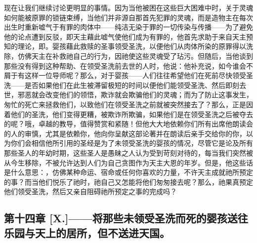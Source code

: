 现在让我们继续讨论更明显的事情。因为当他被困在这些巨大困难中时，关于灵魂如何能被原罪的锁链束缚，当他们并非源自那首先犯罪的灵魂，而是造物主在每次出生时重新嘘气于有罪的肉体中——纯洁无染于罪的一切传染与传播——为了避免他的论点遭到反驳，即天主藉此嘘气使他们成为有罪的，他首先求助于来自天主预知的理论，即。婴孩藉此救赎的圣事领受圣洗，以便他们从肉体所染的原罪得以洗除，仿佛天主在补救祂自己的行为，因祂使这些灵魂受了玷污。但随后，当他谈到那些没有得到这种帮助、在领受圣洗前去世的人时，他说：他补充说，如今谁会不屑于有这样一位导师呢？那么，对于婴孩——人们往往希望他们在死前尽快领受圣洗——是否如果他们在此生被滞留极短的时间以便他们能领受圣洗、然后即刻去世，邪恶就会改变他们的领悟，欺诈就会欺骗他们的灵魂；而为了防止这事发生，匆忙的死亡来拯救他们，以致他们在领受圣洗之前就被突然接去了？那么，正是因着他们的圣洗，他们变得更糟，被欺诈所欺骗，如果他们是在领受圣洗之后被夺去的呢？哦，卓越的教导，值得赞赏和紧随！但他大大地依赖你们所有出席他朗读会的人的审慎，尤其是依赖你，他向你呈献这部论著并在朗读后亲手交给你的你，以为你们会相信他所引用的圣经是为了未领受圣洗的婴孩的情况，尽管它是论及所有那些圣人的年幼时期，这些圣人是愚昧之人认为受到苛刻对待的，每当我们突然被从今生移除，不被允许达到人们为自己贪图作为天主大恩的年岁。但是，他这些话是什么意思：，仿佛某种命运、宿命或任何你喜欢的力量，不许天主成就祂所预定的事？而当他们悦乐了祂时，祂自己又怎能将他们匆匆接去呢？那么，祂果真预定他们领受圣洗，然后又亲自阻碍祂所预定之事的完成吗？\par


\subsection{第十四章 [X.]——将那些未领受圣洗而死的婴孩送往乐园与天上的居所，但不送进天国。}

